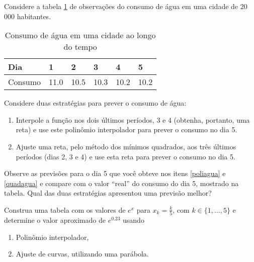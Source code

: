 \begin{ex}
Considere a tabela \ref{cidade} de observações do consumo de água em uma cidade de 20 000 habitantes.

\begin{table}[htb]
\centering
\caption{Consumo de água em uma cidade ao longo do tempo}
\label{cidade}
\begin{tabular}{@{}llllll@{}}
\toprule
Dia     & 1    & 2    & 3    & 4    & 5    \\ \midrule
Consumo & 11.0 & 10.5 & 10.3 & 10.2 & 10.2 \\ \bottomrule
\end{tabular}
\end{table}
Considere duas estratégias para prever o consumo de água:
\begin{enumerate}
\item Interpole a função nos dois últimos períodos, 3 e 4 (obtenha, portanto, uma reta) e use este polinômio interpolador para prever o consumo no dia 5. \label{poliagua}
\item Ajuste uma reta, pelo método dos mínimos quadrados, aos três últimos períodos (dias 2, 3 e 4) e use esta reta para prever o consumo no dia 5. \label{quadagua} 
\end{enumerate}
Observe as previsões para o dia 5 que você obteve nos itens \ref{poliagua} e \ref{quadagua} e compare com o valor ``real'' do consumo do dia 5, mostrado na tabela. Qual das duas estratégias apresentou uma previsão melhor?
\end{ex}

\begin{ex}
Construa uma tabela com os valores de $e^x$ para $x_k=\frac{k}{5}$, com $k\in\{1,...,5\}$ e determine o valor aproximado de $e^{0.23}$ usando
\begin{enumerate}
\item Polinômio interpolador,
\item Ajuste de curvas, utilizando uma parábola.
\end{enumerate} 
\end{ex}

